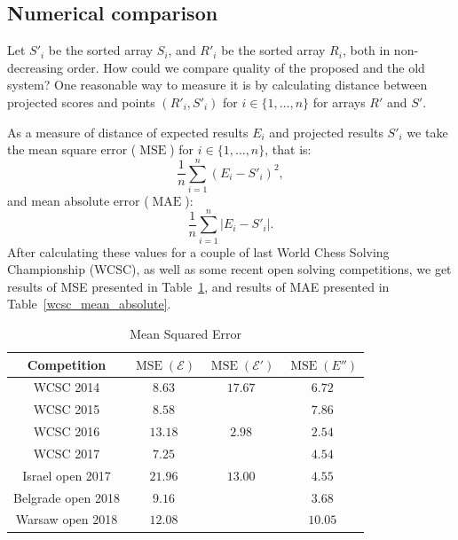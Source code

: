 \documentclass[preprint,12pt]{article}
\newcommand{\E}{\mathcal{E}}
\DeclareMathOperator{\MSE}{MSE}
\DeclareMathOperator{\MAE}{MAE}
\begin{document}
\clearpage

\subsection{Numerical comparison}

Let $S'_i$ be the sorted array $S_i$,
and $R'_i$ be the sorted array $R_i$, both in non-decreasing order.
How could we compare quality of the proposed and the old system?
One reasonable way to measure it
is by calculating distance between projected scores and
points $(R'_i, S'_i)$ for $i\in\{1,\dots,n\}$ for arrays $R'$ and $S'$.

As a measure of distance of expected results $E_i$
and projected results $S'_i$
we take the mean square error ($\MSE$) for $i\in \{1,\dots,n\}$, that is:
\begin{equation}
\frac{1}{n}\sum_{i=1}^n (E_i-S'_i)^2,
\end{equation}
and mean absolute error ($\MAE$):
\begin{equation}
\frac{1}{n}\sum_{i=1}^n |E_i-S'_i|.
\end{equation}
After calculating these values for a couple
of last World Chess Solving Championship (WCSC),
as well as some recent open solving competitions,
we get results of MSE presented in Table~\ref{wcsc_mean_squared},
and results of MAE presented in Table~\ref{wcsc_mean_absolute}.

\begin{table}[h]
\begin{center}
\begin{tabular}{|c|c|c|c|}
\hline
Competition & $\MSE(\E)$ & $\MSE(\E')$ & $\MSE(E'')$\\
\hline
WCSC 2014 & $8.63$ & $17.67$ & $6.72$\\
\hline
WCSC 2015 & $8.58$ & & $7.86$\\
\hline
WCSC 2016 & $13.18$ & $2.98$ & $2.54$\\
\hline
WCSC 2017 & $7.25$ & & $4.54$\\
\hline
Israel open 2017 & $21.96$ & $13.00$ & $4.55$\\
\hline
Belgrade open 2018 & $9.16$ & & $3.68$\\
\hline
Warsaw open 2018 & $12.08$ & & $10.05$\\
\hline
\end{tabular}
\end{center}\caption{Mean Squared Error}\label{wcsc_mean_squared}
\end{table}
\end{document}
